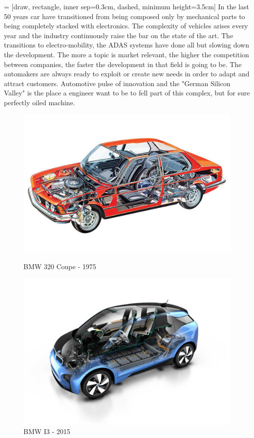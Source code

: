 \documentclass[../main.tex]{subfiles}
\begin{document}
 = [draw, rectangle, inner sep=0.3cm, dashed, minimum height=3.5cm]
In the last 50 years car have transitioned from being composed only by mechanical parts to being completely stacked with electronics. The complexity of vehicles arises every year and the industry continuously raise the bar on the state of the art. The transitions to electro-mobility, the ADAS systems have done all but slowing down the development. The more a topic is market relevant, the higher the competition between companies, the faster the development in that field is going to be. The automakers are always ready to exploit or create new needs in order to adapt and attract customers. Automotive pulse of innovation and the "German Silicon Valley" is the place a engineer want to be to fell part of this complex, but for sure perfectly oiled machine.   
\begin{figure}
\centering
\begin{minipage}{.5\textwidth}
  \centering
  \includegraphics[width=\linewidth]{images_folder/4a56e1d50b56da42a10e29d451cf2b93.jpg}
  \caption{BMW 320 Coupe - 1975}
  \label{fig:test1}
\end{minipage}%
\begin{minipage}{.5\textwidth}
  \centering
  \includegraphics[width=\linewidth]{images_folder/BMW_i3.jpg}
  \caption{BMW I3 - 2015}
  \label{fig:test2}
\end{minipage}
\end{figure}
\end{document}

